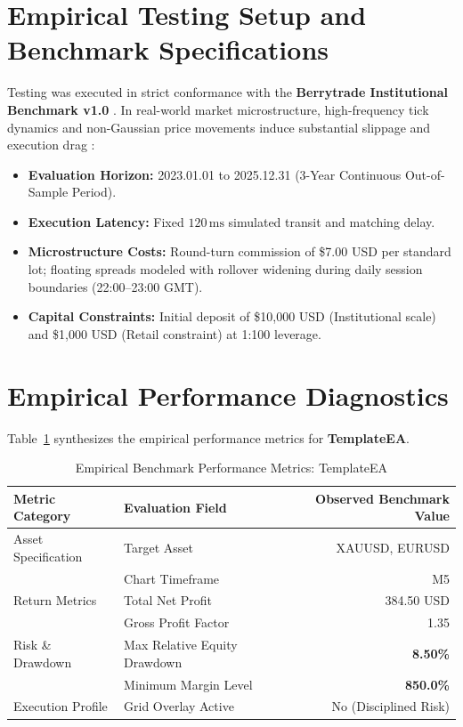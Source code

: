 \documentclass[11pt,a4paper]{article}
\begin{document}
\section{Empirical Testing Setup and Benchmark Specifications}
Testing was executed in strict conformance with the \textbf{Berrytrade Institutional Benchmark v1.0} \cite{artsu2026illusion}. In real-world market microstructure, high-frequency tick dynamics and non-Gaussian price movements induce substantial slippage and execution drag \cite{kyle1985continuous, amihud2002illiquidity, cont2001empirical, mandelbrot1963variation}:
\begin{itemize}
    \item \textbf{Evaluation Horizon:} 2023.01.01 to 2025.12.31 (3-Year Continuous Out-of-Sample Period).
    \item \textbf{Execution Latency:} Fixed $120\,\text{ms}$ simulated transit and matching delay.
    \item \textbf{Microstructure Costs:} Round-turn commission of \$7.00 USD per standard lot; floating spreads modeled with rollover widening during daily session boundaries (22:00--23:00 GMT).
    \item \textbf{Capital Constraints:} Initial deposit of \$10,000 USD (Institutional scale) and \$1,000 USD (Retail constraint) at 1:100 leverage.
\end{itemize}

\section{Empirical Performance Diagnostics}
Table~\ref{tab:metrics} synthesizes the empirical performance metrics for \textbf{TemplateEA}.

\begin{table}[H]
\centering
\caption{Empirical Benchmark Performance Metrics: TemplateEA}
\label{tab:metrics}
\begin{tabular}{llr}
\toprule
\textbf{Metric Category} & \textbf{Evaluation Field} & \textbf{Observed Benchmark Value} \\
\midrule
Asset Specification & Target Asset & XAUUSD, EURUSD \\
& Chart Timeframe & M5 \\
Return Metrics & Total Net Profit & 384.50 USD \\
& Gross Profit Factor & 1.35 \\
Risk \& Drawdown & Max Relative Equity Drawdown & \textbf{8.50\%} \\
& Minimum Margin Level & \textbf{850.0\%} \\
Execution Profile & Grid Overlay Active & No (Disciplined Risk) \\
\bottomrule
\end{tabular}
\end{table}
\end{document}
